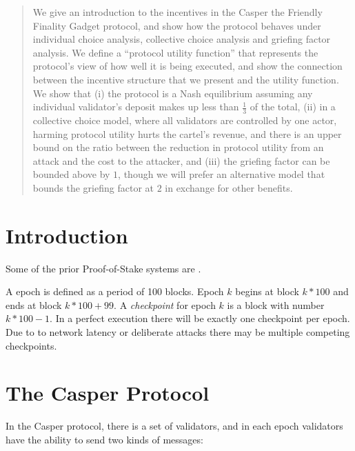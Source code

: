 \documentclass[12pt, final]{article}
\begin{document}
\maketitle

\begin{center} \vspace{-15pt} {\red{\today}} \end{center}


\begin{abstract}
We give an introduction to the incentives in the Casper the Friendly Finality Gadget protocol, and show how the protocol behaves under individual choice analysis, collective choice analysis and griefing factor analysis. We define a ``protocol utility function'' that represents the protocol's view of how well it is being executed, and show the connection between the incentive structure that we present and the utility function. We show that (i) the protocol is a Nash equilibrium assuming any individual validator's deposit makes up less than $\frac{1}{3}$ of the total, (ii) in a collective choice model, where all validators are controlled by one actor, harming protocol utility hurts the cartel's revenue, and there is an upper bound on the ratio between the reduction in protocol utility from an attack and the cost to the attacker, and (iii) the griefing factor can be bounded above by $1$, though we will prefer an alternative model that bounds the griefing factor at $2$ in exchange for other benefits.
\end{abstract}


\section{Introduction}
\label{sect:intro}
Some of the prior Proof-of-Stake systems are \cite{bentov2016pos,king2012ppcoin,vasin2014blackcoin}.


A epoch is defined as a period of 100 blocks.  Epoch $k$ begins at block $k*100$ and ends at block $k*100 + 99$.  A \emph{checkpoint} for epoch $k$ is a block with number $k*100 - 1$.  In a perfect execution there will be exactly one checkpoint per epoch.  Due to to network latency or deliberate attacks there may be multiple competing checkpoints.  

\section{The Casper Protocol}
\label{sect:casperprotocol}
In the Casper protocol, there is a set of validators, and in each epoch validators have the ability to send two kinds of messages:
\end{document}
